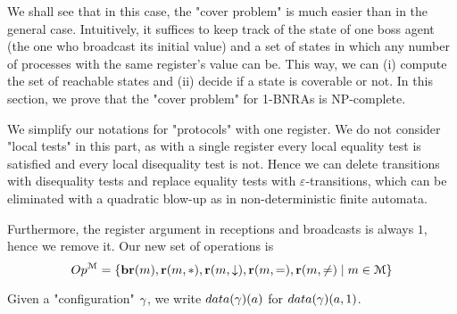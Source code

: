 

	We shall see that in this case, the "cover problem" is much easier than in the general case. Intuitively, it suffices to keep track of the state of one boss agent (the one who broadcast its initial value) and a set of states in which any number of processes with the same register's value can be. This way, we can (i) compute the set of reachable states and (ii) decide if a state is coverable or not. In this section, we prove that the "cover problem" for 1-BNRAs is NP-complete.

	We simplify our notations for "protocols" with one register.
	We do not consider "local tests" in this part, as with a single register every local equality test is satisfied and every local disequality test is not.
	Hence we can delete transitions with disequality tests and replace equality tests with $\varepsilon$-transitions, which can be eliminated with a quadratic blow-up as in non-deterministic finite automata.
	
	Furthermore, the register argument in receptions and broadcasts is always $1$, hence we remove it.
	Our new set of operations is 
	\[
	Op^{\mathcal{M}} = \{\textbf{br}(m), \textbf{r}(m, {*}), \textbf{r}(m, \downarrow), \textbf{r}(m, {=}), \textbf{r}(m, {\ne}) \mid m \in \mathcal{M}\}
	\]
	
	Given a "configuration" $\gamma$, we write $\data{\config}(a)$ for $\data{\config}(a,1)$. 

	




